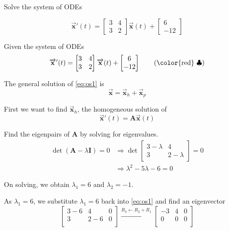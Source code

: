 \begin{example}
    Solve the system of ODEs

    \[
        \overrightarrow{\mathbf{x}}'(t) = \begin{bmatrix}
            3 & 4\\ 3 & 2
        \end{bmatrix}
        \overrightarrow{\mathbf{x}}(t) + \begin{bmatrix}
            6 \\ -12
        \end{bmatrix}
    \]
\end{example}
\begin{solution}
    Given the system of ODEs
    \begin{equation*}
        \overrightarrow{\mathbf{x}}'(t) = \begin{bmatrix}
            3 & 4\\ 3 & 2
        \end{bmatrix}
        \overrightarrow{\mathbf{x}}(t) + \begin{bmatrix}
            6 \\ -12
        \end{bmatrix} \label{eq:os1} \tag{{\color{red} $\clubsuit $}}
    \end{equation*}

    The general solution of \eqref{eq:os1} is 
    \[
        \overrightarrow{\mathbf{x}} = \overrightarrow{\mathbf{x}}_h + \overrightarrow{\mathbf{x}}_p
    \]

    First we want to find $\overrightarrow{\mathbf{x}}_h$, the homogeneous solution of 
    \[
        \overrightarrow{\mathbf{x}}'(t) = \mathbf{A}\overrightarrow{\mathbf{x}}(t)
    \]

    Find the eigenpairs of $\mathbf{A}$ by solving for eigenvalues.
    \begin{align*}
        \det (\mathbf{A} - \lambda \mathbf{I}) = 0 &\Rightarrow 
        \det \begin{bmatrix}
            3-\lambda & 4\\ 3 & 2 - \lambda
        \end{bmatrix} = 0\\
        &\Rightarrow \lambda^2 - 5\lambda - 6 = 0
    \end{align*}

    On solving, we obtain $\lambda_1 = 6$ and $\lambda_2 = -1$.

    As $\lambda_1 = 6$, we substitute $\lambda_1 = 6$ back into \eqref{eq:os1} and find an eigenvector
    \[
        \left[
        \begin{array}{cc|c}
        3-6 & 4 & 0 \\
        3 & 2-6 & 0 \\
        \end{array}
        \right] \xrightarrow[]{R_2 \leftarrow R_2 + R_1}
        \left[
        \begin{array}{cc|c}
        -3 & 4 & 0 \\
        0 & 0 & 0 \\
        \end{array}
        \right]
    \]


\end{solution}
